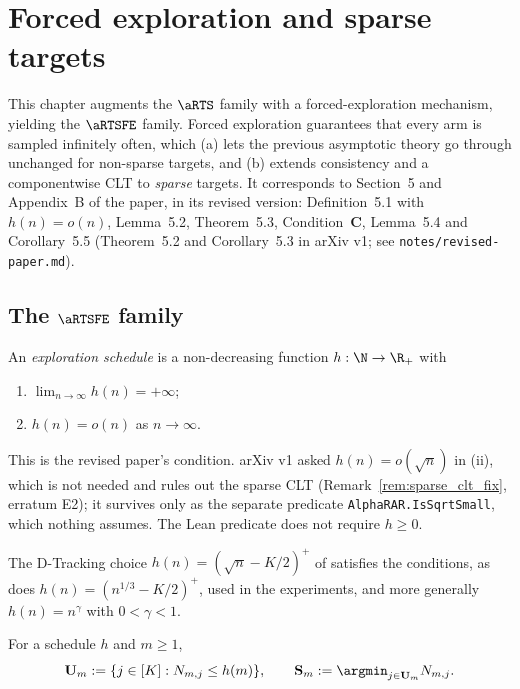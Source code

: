 \chapter{Forced exploration and sparse targets}
\label{chap:forced}

This chapter augments the $\aRTS$ family with a forced-exploration mechanism,
yielding the $\aRTSFE$ family. Forced exploration guarantees that every arm is
sampled infinitely often, which (a) lets the previous asymptotic theory go
through unchanged for non-sparse targets, and (b) extends consistency and a
componentwise CLT to \emph{sparse} targets. It corresponds to Section~5 and
Appendix~B of the paper, in its revised version: Definition~5.1 with $h(n)=o(n)$, Lemma~5.2,
Theorem~5.3, Condition~\textbf{C}, Lemma~5.4 and Corollary~5.5 (Theorem~5.2 and Corollary~5.3 in
arXiv v1; see \texttt{notes/revised-paper.md}).

\section{The \texorpdfstring{$\aRTSFE$}{aRTS-FE} family}
\label{sec:forced_def}

\begin{definition}\label{def:exploration_schedule}
\leanok
An \emph{exploration schedule} is a non-decreasing function $h : \N \to \R_+$ with
\begin{enumerate}
  \item[(i)] $\lim_{n\to\infty} h(n) = +\infty$;
  \item[(ii)] $h(n) = o(n)$ as $n\to\infty$.
\end{enumerate}
This is the revised paper's condition. arXiv v1 asked $h(n)=o(\sqrt n)$ in (ii), which is not needed
and rules out the sparse CLT (Remark~\ref{rem:sparse_clt_fix}, erratum E2); it survives only as the
separate predicate \texttt{AlphaRAR.IsSqrtSmall}, which nothing assumes. The Lean predicate does not
require $h\ge0$.
\end{definition}

\begin{example}\label{ex:h_choice}
The D-Tracking choice $h(n) = (\sqrt n - K/2)^+$ of \cite{garivier2016optimal}
satisfies the conditions, as does $h(n) = (n^{1/3} - K/2)^+$, used in the experiments, and
more generally $h(n)=n^\gamma$ with $0<\gamma<1$.
\end{example}

\begin{definition}\label{def:underexplored_sets}
For a schedule $h$ and $m\ge1$,
\[
  \mathbf{U}_m := \{ j\in[K] : N_{m,j} \le h(m)\}, \qquad
  \mathbf{S}_m := \argmin_{j\in\mathbf{U}_m} N_{m,j}.
\]
\end{definition}

